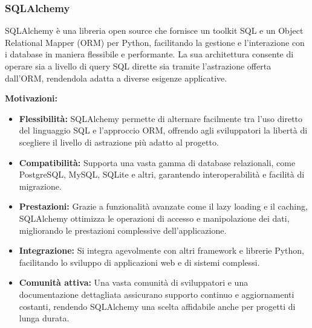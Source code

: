 \subsubsection{SQLAlchemy}
\label{subsubsec:sqlalchemy}

SQLAlchemy è una libreria open source che fornisce un toolkit SQL e un Object Relational Mapper (ORM) per Python, facilitando la gestione e l'interazione con i database in maniera flessibile e performante. La sua architettura consente di operare sia a livello di query SQL dirette sia tramite l'astrazione offerta dall'ORM, rendendola adatta a diverse esigenze applicative.

\textbf{Motivazioni:}
\begin{itemize}
    \item \textbf{Flessibilità:} SQLAlchemy permette di alternare facilmente tra l'uso diretto del linguaggio SQL e l'approccio ORM, offrendo agli sviluppatori la libertà di scegliere il livello di astrazione più adatto al progetto.
    \item \textbf{Compatibilità:} Supporta una vasta gamma di database relazionali, come PostgreSQL, MySQL, SQLite e altri, garantendo interoperabilità e facilità di migrazione.
    \item \textbf{Prestazioni:} Grazie a funzionalità avanzate come il lazy loading e il caching, SQLAlchemy ottimizza le operazioni di accesso e manipolazione dei dati, migliorando le prestazioni complessive dell'applicazione.
    \item \textbf{Integrazione:} Si integra agevolmente con altri framework e librerie Python, facilitando lo sviluppo di applicazioni web e di sistemi complessi.
    \item \textbf{Comunità attiva:} Una vasta comunità di sviluppatori e una documentazione dettagliata assicurano supporto continuo e aggiornamenti costanti, rendendo SQLAlchemy una scelta affidabile anche per progetti di lunga durata.
\end{itemize}
